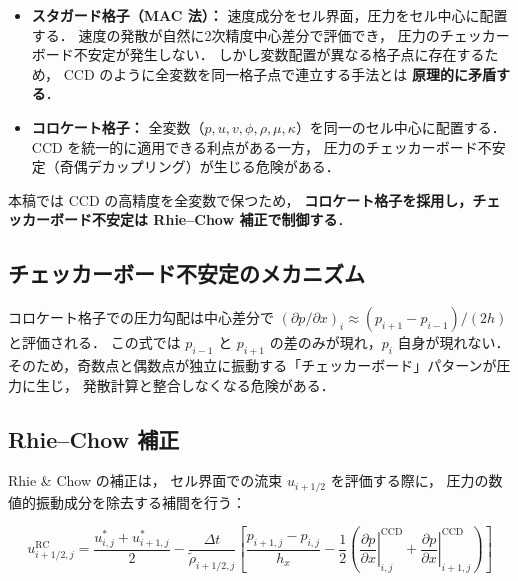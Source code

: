 \documentclass[12pt, a4paper, titlepage]{article}
\newcommand{\jp}[1]{{\normalfont\jpfont #1}}
\begin{document}
\begin{itemize}
  \item \jp{\textbf{スタガード格子（MAC 法）：}
        速度成分をセル界面，圧力をセル中心に配置する．
        速度の発散が自然に2次精度中心差分で評価でき，
        圧力のチェッカーボード不安定が発生しない．
        しかし変数配置が異なる格子点に存在するため，
        CCD のように全変数を同一格子点で連立する手法とは
        \textbf{原理的に矛盾する}．}

  \item \jp{\textbf{コロケート格子：}
        全変数（$p, u, v, \phi, \rho, \mu, \kappa$）を同一のセル中心に配置する．
        CCD を統一的に適用できる利点がある一方，
        圧力のチェッカーボード不安定（奇偶デカップリング）が生じる危険がある．}
\end{itemize}

\jp{本稿では CCD の高精度を全変数で保つため，
\textbf{コロケート格子を採用し，チェッカーボード不安定は Rhie--Chow 補正で制御する}．}

\subsection{\jp{チェッカーボード不安定のメカニズム}}

\jp{コロケート格子での圧力勾配は中心差分で
$(\partial p/\partial x)_i \approx (p_{i+1}-p_{i-1})/(2h)$ と評価される．
この式では $p_{i-1}$ と $p_{i+1}$ の差のみが現れ，$p_i$ 自身が現れない．
そのため，奇数点と偶数点が独立に振動する「チェッカーボード」パターンが圧力に生じ，
発散計算と整合しなくなる危険がある．}

\subsection{Rhie--Chow \jp{補正}}

\jp{Rhie \& Chow \cite{RhieChow1983} の補正は，
セル界面での流束 $u_{i+1/2}$ を評価する際に，
圧力の数値的振動成分を除去する補間を行う：}
\begin{tcolorbox}[mybox, title={Rhie--Chow \jp{補正速度（セル界面，2次元）}}]
\begin{equation}
  u_{i+1/2,j}^{\mathrm{RC}}
  = \frac{u^*_{i,j} + u^*_{i+1,j}}{2}
  - \frac{\Delta t}{\tilde\rho_{i+1/2,j}}
    \!\left[
      \frac{p_{i+1,j} - p_{i,j}}{h_x}
      - \frac{1}{2}\!\left(
        \left.\frac{\partial p}{\partial x}\right|_{i,j}^{\mathrm{CCD}}
        + \left.\frac{\partial p}{\partial x}\right|_{i+1,j}^{\mathrm{CCD}}
      \right)
    \right]
  \label{eq:rhie_chow}
\end{equation}
\end{tcolorbox}
\end{document}
